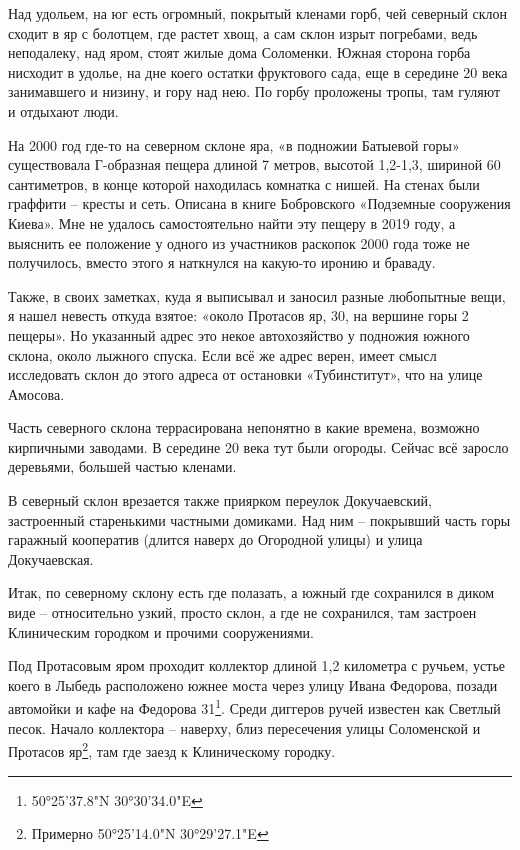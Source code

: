 Над удольем, на юг есть огромный, покрытый кленами горб, чей северный склон сходит в яр с болотцем, где растет хвощ, а сам склон изрыт погребами, ведь неподалеку, над яром, стоят жилые дома Соломенки. Южная сторона горба нисходит в удолье, на дне коего остатки фруктового сада, еще в середине 20 века занимавшего и низину, и гору над нею. По горбу проложены тропы, там гуляют и отдыхают люди.

На 2000 год где-то на северном склоне яра, «в подножии Батыевой горы» существовала Г-образная пещера длиной 7 метров, высотой 1,2-1,3, шириной 60 сантиметров, в конце которой находилась комнатка с нишей. На стенах были граффити – кресты и сеть. Описана в книге Бобровского «Подземные сооружения Киева». Мне не удалось самостоятельно найти эту пещеру в 2019 году, а выяснить ее положение у одного из участников раскопок 2000 года тоже не получилось, вместо этого я наткнулся на какую-то иронию и браваду.

Также, в своих заметках, куда я выписывал и заносил разные любопытные вещи, я нашел невесть откуда взятое: «около Протасов яр, 30, на вершине горы 2 пещеры». Но указанный адрес это некое автохозяйство у подножия южного склона, около лыжного спуска. Если всё же адрес верен, имеет смысл исследовать склон до этого адреса от остановки «Тубинститут», что на улице Амосова.

Часть северного склона террасирована непонятно в какие времена, возможно кирпичными заводами. В середине 20 века тут были огороды. Сейчас всё заросло деревьями, большей частью кленами.

В северный склон врезается также приярком переулок Докучаевский, застроенный старенькими частными домиками. Над ним – покрывший часть горы гаражный кооператив (длится наверх до Огородной улицы) и улица Докучаевская.

Итак, по северному склону есть где полазать, а южный где сохранился в диком виде – относительно узкий, просто склон, а где не сохранился, там застроен Клиническим городком и прочими сооружениями.

Под Протасовым яром проходит коллектор длиной 1,2 километра с ручьем, устье коего в Лыбедь расположено южнее моста через улицу Ивана Федорова, позади автомойки и кафе на Федорова 31\footnote{50°25'37.8"N 30°30'34.0"E}. Среди диггеров ручей известен как Светлый песок. Начало коллектора – наверху, близ пересечения улицы Соломенской и Протасов яр\footnote{Примерно 50°25'14.0"N 30°29'27.1"E}, там где заезд к Клиническому городку.\\

